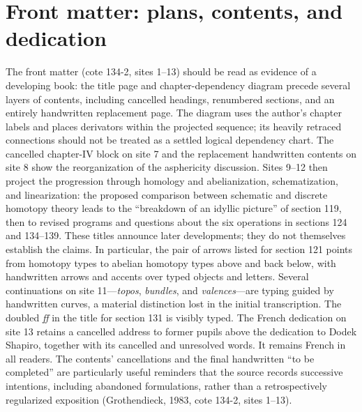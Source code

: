 \section*{Front matter: plans, contents, and dedication}
The front matter (cote 134-2, sites 1--13) should be read as evidence of a developing book: the title page and chapter-dependency diagram precede several layers of contents, including cancelled headings, renumbered sections, and an entirely handwritten replacement page. The diagram uses the author's chapter labels and places derivators within the projected sequence; its heavily retraced connections should not be treated as a settled logical dependency chart. The cancelled chapter-IV block on site 7 and the replacement handwritten contents on site 8 show the reorganization of the asphericity discussion. Sites 9--12 then project the progression through homology and abelianization, schematization, and linearization: the proposed comparison between schematic and discrete homotopy theory leads to the ``breakdown of an idyllic picture'' of section 119, then to revised programs and questions about the six operations in sections 124 and 134--139. These titles announce later developments; they do not themselves establish the claims. In particular, the pair of arrows listed for section 121 points from homotopy types to abelian homotopy types above and back below, with handwritten arrows and accents over typed objects and letters. Several continuations on site 11---\emph{topos}, \emph{bundles}, and \emph{valences}---are typing guided by handwritten curves, a material distinction lost in the initial transcription. The doubled \emph{ff} in the title for section 131 is visibly typed. The French dedication on site 13 retains a cancelled address to former pupils above the dedication to Dodek Shapiro, together with its cancelled and unresolved words. It remains French in all readers. The contents' cancellations and the final handwritten ``to be completed'' are particularly useful reminders that the source records successive intentions, including abandoned formulations, rather than a retrospectively regularized exposition (Grothendieck, 1983, cote 134-2, sites 1--13).
